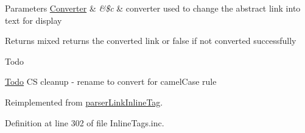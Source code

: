 \begin{DoxyParams}[1]{\-Parameters}
\hyperlink{class_converter}{\-Converter} & {\em \&\$c} & converter used to change the abstract link into text for display\\
\hline
\end{DoxyParams}
\begin{DoxyReturn}{\-Returns}
mixed returns the converted link or false if not converted successfully 
\end{DoxyReturn}
\begin{DoxyRefDesc}{\-Todo}
\item[\hyperlink{todo__todo000114}{\-Todo}]\-C\-S cleanup -\/ rename to convert for camel\-Case rule \end{DoxyRefDesc}


\-Reimplemented from \hyperlink{classparser_link_inline_tag_ad6c06bea9d11cc1c362b592306cfa707}{parser\-Link\-Inline\-Tag}.



\-Definition at line 302 of file \-Inline\-Tags.\-inc.


